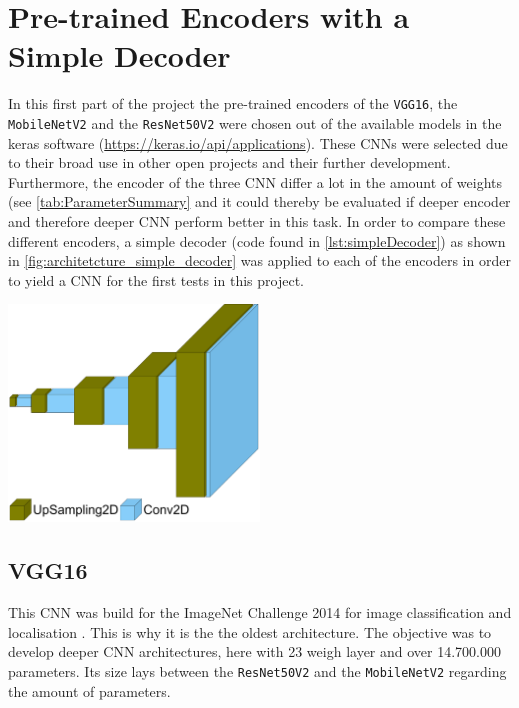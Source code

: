 \section{Pre-trained Encoders with a Simple Decoder}
In this first part of the project the pre-trained encoders of the \verb|VGG16|, the \verb|MobileNetV2| and the \verb|ResNet50V2| were chosen out of the available models in the keras software (\url{https://keras.io/api/applications}). These CNNs were selected due to their broad use in other open projects and their further development. Furthermore, the encoder of the three CNN differ a lot in the amount of weights (see \cref{tab:ParameterSummary} and it could thereby be evaluated if deeper encoder and therefore deeper CNN perform better in this task. In order to compare these different encoders, a simple decoder (code found in \cref{lst:simpleDecoder}) as shown in \cref{fig:architetcture_simple_decoder} was applied to each of the encoders in order to yield a CNN for the first tests in this project.\\
\begin{minipage}[t]{\textwidth}
\centering
	\includegraphics[width=0.5\textwidth]{Images/model_plot/simple_decoder.png}
	\label{fig:architetcture_simple_decoder}
\end{minipage}

\subsection{VGG16}
This CNN was build for the ImageNet Challenge 2014 for image classification and localisation \cite{simonyan2015deep}. This is why it is the the oldest architecture. The objective was to develop deeper CNN architectures, here with 23 weigh layer and over 14.700.000 parameters. Its size lays between the \verb|ResNet50V2| and the \verb|MobileNetV2| regarding the amount of parameters.\\

